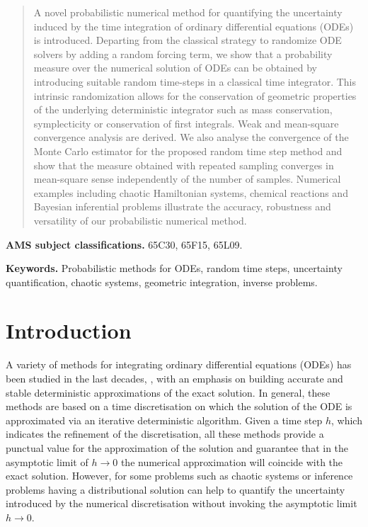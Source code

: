 \documentclass[10pt]{article}
\begin{document}
\maketitle	

\begin{abstract} 
A novel probabilistic numerical method for  quantifying the uncertainty induced by the time integration of ordinary differential equations (ODEs) is introduced. Departing from the classical strategy to randomize ODE solvers by adding a random forcing term, we show that a probability measure over the numerical solution of ODEs can be obtained by introducing suitable random time-steps in a classical time integrator.
This  intrinsic randomization allows for the conservation of geometric properties of the underlying deterministic integrator such as mass conservation, symplecticity or conservation of first integrals. Weak and mean-square convergence analysis are derived. We also analyse the convergence of the Monte Carlo estimator for the proposed random time step method and show that the measure obtained with repeated sampling converges in mean-square sense independently of the number of samples. Numerical examples including chaotic Hamiltonian systems, chemical reactions and Bayesian inferential problems illustrate the accuracy, robustness and versatility of our probabilistic numerical method.
\end{abstract}

\textbf{AMS subject classifications.} 65C30, 65F15, 65L09.

\textbf{Keywords.} Probabilistic methods for ODEs, random time steps, uncertainty quantification, chaotic systems, geometric integration, inverse problems.

\normalsize
\section{Introduction} 
A variety of methods for integrating ordinary differential equations (ODEs) has been studied in the last decades, \cite{HNW93, HaW96, HLW06}, with an emphasis on building accurate and stable deterministic approximations of the exact solution. In general, these methods are based on a time discretisation on which the solution of the ODE is approximated via an iterative deterministic algorithm. Given a time step $h$, which indicates the refinement of the discretisation, all these methods provide a punctual value for the approximation of the solution and guarantee that in the asymptotic limit of $h \to 0$ the numerical approximation will coincide with the exact solution. However, for some problems such as chaotic systems or inference problems having a distributional solution can help to quantify the uncertainty introduced by the numerical discretisation without invoking the asymptotic limit $h \to 0$.
\end{document}
